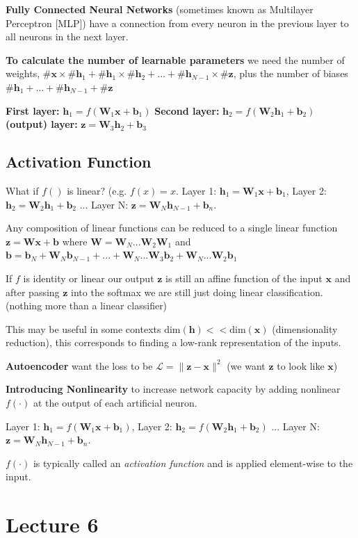 \documentclass[twocolumn, letter, 10pt, landscape]{article}
\newcommand{\mb}{\mathbf}
\newcommand{\tb}{\textbf}
\newcommand{\ti}{\textit}
\begin{document}
\tb{Fully Connected Neural Networks} (sometimes known as Multilayer Perceptron [MLP]) have a connection from every neuron in the previous layer to all neurons in the next layer.

\tb{To calculate the number of learnable parameters} we need the number of weights, $\#\mb{x}\times \#\mb{h}_1 + \#\mb{h}_1\times \#\mb{h}_2+...+ \#\mb{h}_{N-1}\times \#\mb{z}$, plus the number of biases $\#\mb{h}_1+...+\#\mb{h}_{N-1}+\#\mb{z}$

\tb{First layer:} $\mb{h}_1=f(\mb{W}_1\mb{x}+\mb{b}_1)$
\tb{Second layer:} $\mb{h}_2=f(\mb{W}_2\mb{h}_1+\mb{b}_2)$
\tb{(output) layer:} $\mb{z}=\mb{W}_3\mb{h}_2+\mb{b}_3$

\subsection{Activation Function}
What if $f()$  is linear? (e.g. $f(x)=x$. Layer 1: $\mb{h}_1=\mb{W}_1\mb{x}+\mb{b}_1$, Layer 2: $\mb{h}_2=\mb{W}_2\mb{h}_1+\mb{b}_2$ ... Layer N: $\mb{z}=\mb{W}_N\mb{h}_{N-1}+\mb{b}_n$.

Any composition of linear functions can be reduced to a single linear function $\mb{z}=\mb{Wx}+\mb{b}$ where $\mb{W} = \mb{W}_N...\mb{W}_2\mb{W}_1$ and $\mb{b}=\mb{b}_N + \mb{W}_N\mb{b}_{N-1} + ... + \mb{W}_N...\mb{W}_3\mb{b}_2+\mb{W}_N...\mb{W}_2\mb{b}_1$

If $f$ is identity or linear our output $\mb{z}$ is still an affine function of the input $\mb{x}$ and after passing $\mb{z}$ into the softmax we are still just doing linear classification. (nothing more than a linear classifier)

This may be useful in some contexts $\text{dim}(\mb{h}) << \text{dim}(\mb{x})$ (dimensionality reduction), this corresponds to finding a low-rank representation of the inputs.

\tb{Autoencoder} want the loss to be $\mathcal{L}=\|\mb{z}-\mb{x}\|^2$ (we want $\mb{z}$ to look like $\mb{x}$)

\tb{Introducing Nonlinearity} to increase network capacity by adding nonlinear $f(\cdot)$ at the output of each artificial neuron.

Layer 1: $\mb{h}_1=f(\mb{W}_1\mb{x}+\mb{b}_1)$, Layer 2: $\mb{h}_2=f(\mb{W}_2\mb{h}_1+\mb{b}_2)$ ... Layer N: $\mb{z}=\mb{W}_N\mb{h}_{N-1}+\mb{b}_n$.

$f(\cdot)$ is typically called an \ti{activation function} and is applied element-wise to the input.


\section{Lecture 6}
\end{document}
